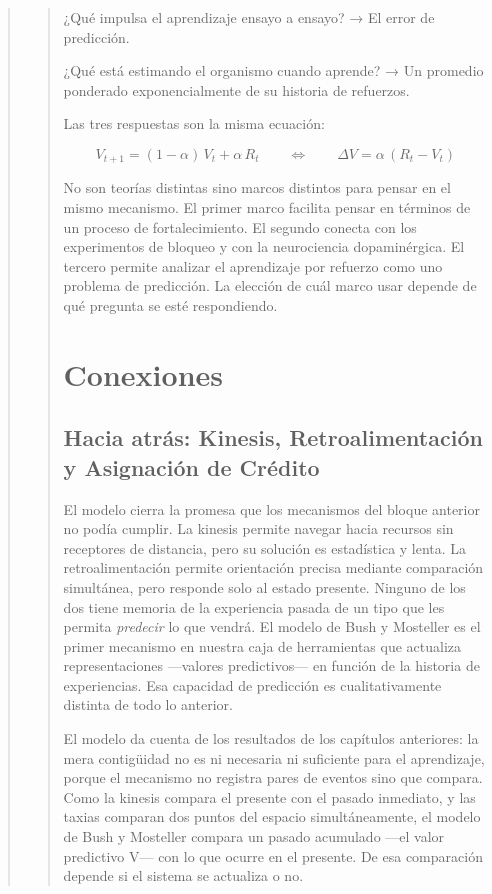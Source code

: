 \documentclass[
  letterpaper,
  DIV=11,
  numbers=noendperiod]{scrreprt}
\begin{document}
\begin{tcolorbox}[enhanced jigsaw, toprule=.15mm, arc=.35mm, colback=white, opacityback=0, colframe=quarto-callout-note-color-frame, breakable, rightrule=.15mm, left=2mm, leftrule=.75mm, bottomrule=.15mm]
\begin{quote}
\begin{quote}
¿Qué impulsa el aprendizaje ensayo a ensayo? → El error de predicción.

¿Qué está estimando el organismo cuando aprende? → Un promedio ponderado
exponencialmente de su historia de refuerzos.

Las tres respuestas son la misma ecuación:

\[V_{t+1} = (1-\alpha)\,V_t + \alpha\,R_t \qquad \Longleftrightarrow \qquad \Delta V = \alpha\,(R_t - V_t)\]

No son teorías distintas sino marcos distintos para pensar en el mismo
mecanismo. El primer marco facilita pensar en términos de un proceso de
fortalecimiento. El segundo conecta con los experimentos de bloqueo y
con la neurociencia dopaminérgica. El tercero permite analizar el
aprendizaje por refuerzo como uno problema de predicción. La elección de
cuál marco usar depende de qué pregunta se esté respondiendo.

\section{Conexiones}\label{conexiones-3}

\subsection{Hacia atrás: Kinesis, Retroalimentación y Asignación de
Crédito}\label{hacia-atruxe1s-kinesis-retroalimentaciuxf3n-y-asignaciuxf3n-de-cruxe9dito}

El modelo cierra la promesa que los mecanismos del bloque anterior no
podía cumplir. La kinesis permite navegar hacia recursos sin receptores
de distancia, pero su solución es estadística y lenta. La
retroalimentación permite orientación precisa mediante comparación
simultánea, pero responde solo al estado presente. Ninguno de los dos
tiene memoria de la experiencia pasada de un tipo que les permita
\emph{predecir} lo que vendrá. El modelo de Bush y Mosteller es el
primer mecanismo en nuestra caja de herramientas que actualiza
representaciones ---valores predictivos--- en función de la historia de
experiencias. Esa capacidad de predicción es cualitativamente distinta
de todo lo anterior.

El modelo da cuenta de los resultados de los capítulos anteriores: la
mera contigüidad no es ni necesaria ni suficiente para el aprendizaje,
porque el mecanismo no registra pares de eventos sino que compara. Como
la kinesis compara el presente con el pasado inmediato, y las taxias
comparan dos puntos del espacio simultáneamente, el modelo de Bush y
Mosteller compara un pasado acumulado ---el valor predictivo V--- con lo
que ocurre en el presente. De esa comparación depende si el sistema se
actualiza o no.


\end{quote}
\end{quote}
\end{tcolorbox}
\end{document}
